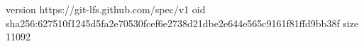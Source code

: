 version https://git-lfs.github.com/spec/v1
oid sha256:627510f1245d5fa2e70530fcef6e2738d21dbe2e644e565c9161f81ffd9bb38f
size 11092
